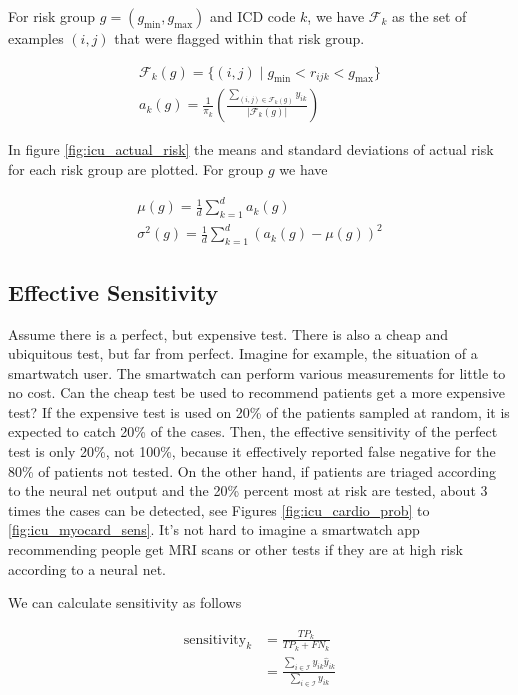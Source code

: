 For risk group $g = (g_\text{min}, g_\text{max})$ and ICD code $k$, we have $\mathcal{F}_k$ as the set of examples $(i, j)$ that were flagged within that risk group.

\begin{gather}
    \mathcal{F}_k(g) = \{ (i, j) \mid g_{\text{min}} < r_{ijk} < g_{\text{max}} \} \\
    a_{k}(g) = \frac{1}{\pi_k} \left( 
        \frac{\sum_{(i, j) \in \mathcal{F}_k(g)} y_{ik}}{|\mathcal{F}_k(g)|}
    \right)
\end{gather}

In figure \ref{fig:icu_actual_risk} the means and standard deviations of actual risk for each risk group are plotted.  For group $g$ we have

\begin{gather}
    \mu(g) = \frac{1}{d} \sum_{k=1}^d a_k(g) \\
    \sigma^2(g) = \frac{1}{d} \sum_{k=1}^d (a_k(g) - \mu(g))^2
\end{gather}

\figIcuActualRisk

\subsection{Effective Sensitivity}

Assume there is a perfect, but expensive test.  There is also a cheap and ubiquitous test, but far from perfect.  Imagine for example, the situation of a smartwatch user.  The smartwatch can perform various measurements for little to no cost.  Can the cheap test be used to recommend patients get a more expensive test?  If the expensive test is used on 20\% of the patients sampled at random, it is expected to catch 20\% of the cases.  Then, the effective sensitivity of the perfect test is only 20\%, not 100\%, because it effectively reported false negative for the 80\% of patients not tested.  On the other hand, if patients are triaged according to the neural net output and the 20\% percent most at risk are tested, about 3 times the cases can be detected, see Figures \ref{fig:icu_cardio_prob} to \ref{fig:icu_myocard_sens}. It’s not hard to imagine a smartwatch app recommending people get MRI scans or other tests if they are at high risk according to a neural net.

We can calculate sensitivity as follows

\begin{align}
    \text{sensitivity}_k 
        &= \frac{TP_k}{TP_k + FN_k} \\
        &= \frac
            {\sum_{i \in \mathcal{I}} y_{ik} \hat{y}_{ik}}
            {\sum_{i \in \mathcal{I}} y_{ik}}
\end{align}

